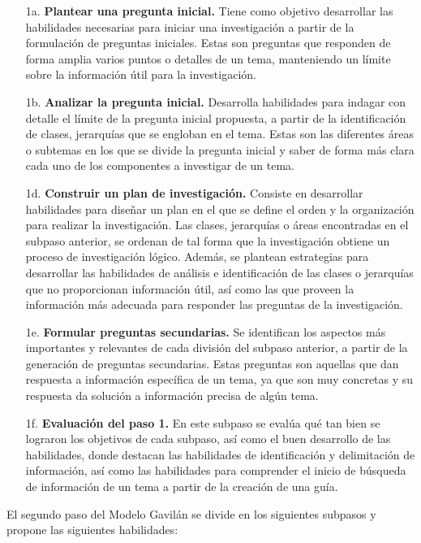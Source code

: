 \begin{itemize}
  \item [1a.] \textbf{Plantear una pregunta inicial.} Tiene como objetivo desarrollar las habilidades necesarias para iniciar una investigación a partir de la formulación de preguntas iniciales. Estas son preguntas que responden de forma amplia varios puntos o detalles de un tema, manteniendo un límite sobre la información útil para la investigación.
  \item [1b.] \textbf{Analizar la pregunta inicial.} Desarrolla habilidades para indagar con detalle el límite de la pregunta inicial propuesta, a partir de la identificación de clases, jerarquías que se engloban en el tema. Estas son las diferentes áreas o subtemas en los que se divide la pregunta inicial y saber de forma más clara cada uno de los componentes a investigar de un tema.
  \item [1d.] \textbf{Construir un plan de investigación.} Consiste en desarrollar habilidades para diseñar un plan en el que se define el orden y la organización para realizar la investigación. Las clases, jerarquías o áreas encontradas en el subpaso anterior, se ordenan de tal forma que la investigación obtiene un proceso de investigación lógico. Además, se plantean estrategias para desarrollar las habilidades de análisis e identificación de las clases o jerarquías que no proporcionan información útil, así como las que proveen la información más adecuada para responder las preguntas de la investigación. 
  \item [1e.] \textbf{Formular preguntas secundarias.} Se identifican los aspectos más importantes y relevantes de cada división del subpaso anterior, a partir de la generación de preguntas secundarias. Estas preguntas son aquellas que dan respuesta a información específica de un tema, ya que son muy concretas y su respuesta da solución a información precisa de algún tema.
  \item [1f.] \textbf{Evaluación del paso 1.} En este subpaso se evalúa qué tan bien se lograron los objetivos de cada subpaso, así como el buen desarrollo de las habilidades, donde destacan las habilidades de identificación y delimitación de información, así como las habilidades para comprender el inicio de búsqueda de información de un tema a partir de la creación de una guía.
\end{itemize}

El segundo paso del Modelo Gavilán se divide en los siguientes subpasos y propone las siguientes habilidades:


